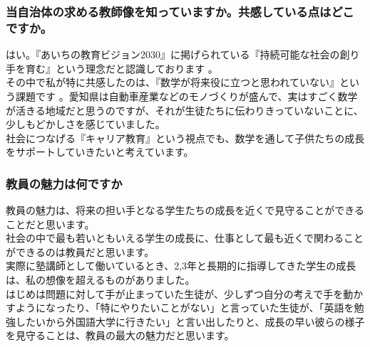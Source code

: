 \documentclass[11pt]{beamer}
\newcommand{\widespacing}{\linespread{1.5}\selectfont}
\begin{document}
\begin{frame}
\frametitle{当自治体の求める教師像を知っていますか。共感している点はどこですか。}
{\widespacing
はい。『あいちの教育ビジョン2030』に掲げられている『持続可能な社会の創り手を育む』という理念だと認識しております 。\\
その中で私が特に共感したのは、『数学が将来役に立つと思われていない』という課題です 。愛知県は自動車産業などのモノづくりが盛んで、実はすごく数学が活きる地域だと思うのですが、それが生徒たちに伝わりきっていないことに、少しもどかしさを感じていました。\\
社会につなげる『キャリア教育』という視点でも、数学を通して子供たちの成長をサポートしていきたいと考えています。\\
}
\end{frame}

\begin{frame}
  \frametitle{教員の魅力は何ですか}
  {\widespacing
  教員の魅力は、将来の担い手となる学生たちの成長を近くで見守ることができることだと思います。\\
  社会の中で最も若いともいえる学生の成長に、仕事として最も近くで関わることができるのは教員だと思います。\\
  実際に塾講師として働いているとき、2,3年と長期的に指導してきた学生の成長は、私の想像を超えるものがありました。\\
  はじめは問題に対して手が止まっていた生徒が、少しずつ自分の考えで手を動かすようになったり、「特にやりたいことがない」と言っていた生徒が、「英語を勉強したいから外国語大学に行きたい」と言い出したりと、成長の早い彼らの様子を見守ることは、教員の最大の魅力だと思います。\\
  }
\end{frame}
\end{document}
